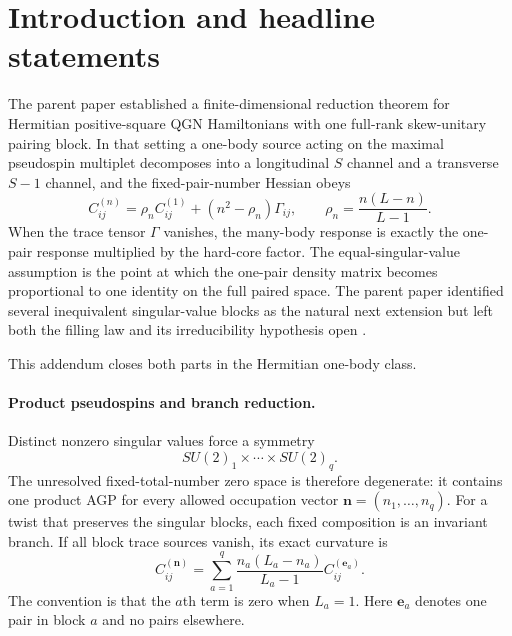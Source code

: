 \documentclass[11pt]{article}
\numberwithin{equation}{section}
\newcommand{\bn}{\mathbf n}
\newcommand{\be}{\mathbf e}
\begin{document}
\section{Introduction and headline statements}
\label{sec:introduction}

The parent paper established a finite-dimensional reduction theorem for Hermitian positive-square QGN Hamiltonians with one full-rank skew-unitary pairing block.  In that setting a one-body source acting on the maximal pseudospin multiplet decomposes into a longitudinal $S$ channel and a transverse $S-1$ channel, and the fixed-pair-number Hessian obeys
\begin{equation}
 C_{ij}^{(n)}
 =
 \rho_n C_{ij}^{(1)}
 +(n^2-\rho_n)\Gamma_{ij},
 \qquad
 \rho_n=\frac{n(L-n)}{L-1}.
 \label{eq:parent-law}
\end{equation}
When the trace tensor $\Gamma$ vanishes, the many-body response is exactly the one-pair response multiplied by the hard-core factor.  The equal-singular-value assumption is the point at which the one-pair density matrix becomes proportional to one identity on the full paired space.  The parent paper identified several inequivalent singular-value blocks as the natural next extension but left both the filling law and its irreducibility hypothesis open \cite{Sledgianowski2026}.

This addendum closes both parts in the Hermitian one-body class.

\paragraph{Product pseudospins and branch reduction.}
Distinct nonzero singular values force a symmetry
\begin{equation}
 SU(2)_1\times\cdots\times SU(2)_q.
 \label{eq:product-group-intro}
\end{equation}
The unresolved fixed-total-number zero space is therefore degenerate: it contains one product AGP for every allowed occupation vector $\bn=(n_1,\ldots,n_q)$.  For a twist that preserves the singular blocks, each fixed composition is an invariant branch.  If all block trace sources vanish, its exact curvature is
\begin{equation}
 \boxed{
 C_{ij}^{(\bn)}
 =
 \sum_{a=1}^q
 \frac{n_a(L_a-n_a)}{L_a-1}
 C_{ij}^{(\be_a)}.}
 \label{eq:headline-block-law}
\end{equation}
The convention is that the $a$th term is zero when $L_a=1$.  Here $\be_a$ denotes one pair in block $a$ and no pairs elsewhere.
\end{document}
